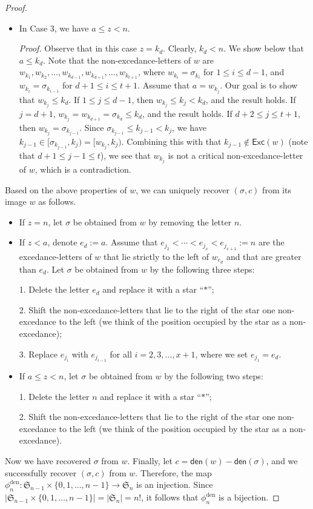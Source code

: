 \documentclass[12pt]{article}
\begin{document}
\begin{proof}
\begin{itemize}
	
\item[$\bullet$] In Case 3, we have $a\leq z<n$.

\emph{Proof.} Observe that in this case $z=k_{d}$.  
Clearly, $k_{d}<n$.
We show below that $a\leq k_{d}$.
Note that the non-excedance-letters of $w$ are
$w_{k_{1}},w_{k_{2}},\ldots,w_{k_{d-1}},w_{k_{d+1}},\ldots,w_{k_{t+1}}$,
where $w_{k_{i}}=\sigma_{k_{i}}$ for $1\leq i\leq d-1$, and $w_{k_{i}}=\sigma_{k_{i-1}}$ for $d+1\leq i\leq t+1$.
Assume that $a=w_{k_{j}}$. 
Our goal is to show that $w_{k_{j}}\leq k_{d}$.
If $1\leq j\leq d-1$, then
$w_{k_{j}}\leq k_{j}<k_{d}$, and the result holds.
If $j=d+1$, $w_{k_{j}}=w_{k_{d+1}}=\sigma_{k_{d}}\leq k_{d}$, 
and the result holds.
If $d+2\leq j\leq t+1$, then $w_{k_{j}}=\sigma_{k_{j-1}}$.
Since $\sigma_{k_{j-1}}\leq k_{j-1}< k_{j}$,
we have $k_{j-1}\in[\sigma_{k_{j-1}},k_{j})=[w_{k_{j}},k_{j})$.
Combining this with that $k_{j-1}\notin\textsf{Exc}(w)$ (note that $d+1\leq j-1\leq t$),
we see that $w_{k_{j}}$ is not a critical non-excedance-letter of $w$,
which is a contradiction.
\end{itemize}
Based on the above properties of $w$, 
we can uniquely recover $(\sigma,c)$ from its image $w$ as follows.
\begin{itemize}
\item[$\bullet$] If $z=n$,
let $\sigma$ be obtained from $w$ by removing the letter $n$.

\item[$\bullet$] If $z<a$,  denote $e_{d}:=a$.
Assume that $e_{j_{2}}<\cdots<e_{j_{x}}<e_{j_{x+1}}:=n$ are the excedance-letters of $w$ that lie strictly to the left of $w_{e_{d}}$ and that are greater than $e_{d}$.
Let $\sigma$ be obtained from $w$ by the following three steps:

1. Delete the letter $e_{d}$ and replace it with a star ``$\ast$'';

2. Shift the non-excedance-letters that lie to the right of the star one non-excedance to the left (we think of the position occupied by the star as a non-excedance);

3. Replace $e_{j_{i}}$ with $e_{j_{i-1}}$ for all $i=2,3,\ldots,x+1$, 
where we set $e_{j_{1}}=e_{d}$.

\item[$\bullet$] If $a\leq z<n$,
let $\sigma$ be obtained from $w$ by the following two steps:

1. Delete the letter $n$ and replace it with a star ``$\ast$'';

2. Shift the non-excedance-letters that lie to the right of the star one non-excedance to the left (we think of the position occupied by the star as a non-excedance).
\end{itemize}
Now we have recovered $\sigma$ from $w$.
Finally, let $c=\textsf{den}(w)-\textsf{den}(\sigma)$,
and we successfully recover $(\sigma,c)$ from $w$.
Therefore, the map $\phi_{n}^{\text{den}}: \mathfrak{S}_{n-1}\times\{0,1,\ldots,n-1\}\rightarrow\mathfrak{S}_{n}
$ is an injection.
Since $|\mathfrak{S}_{n-1}\times\{0,1,\ldots,n-1\}|=|\mathfrak{S}_{n}|=n!$,
it follows that $\phi_{n}^{\text{den}}$ is a bijection.
\end{proof}
\end{document}
